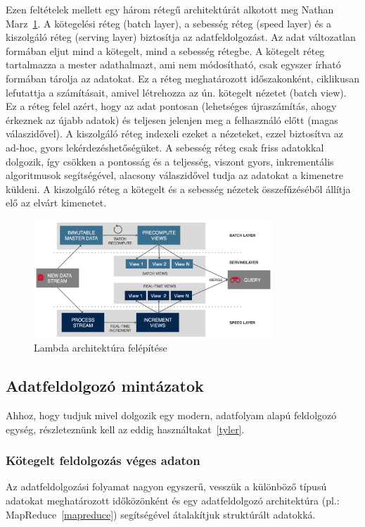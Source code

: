 \documentclass[a4paper,12pt]{article}
\begin{document}
Ezen feltételek mellett egy három rétegű architektúrát alkotott meg Nathan Marz~\ref{lambda}. A kötegelési réteg (batch layer), a sebesség réteg (speed layer) és a kiszolgáló réteg (serving layer) biztosítja az adatfeldolgozást. Az adat változatlan formában eljut mind a kötegelt, mind a sebesség rétegbe. A kötegelt réteg tartalmazza a mester adathalmazt, ami nem módosítható, csak egyszer írható formában tárolja az adatokat. Ez a réteg meghatározott időszakonként, ciklikusan lefutattja a számításait, amivel létrehozza az ún. kötegelt nézetet (batch view). Ez a réteg felel azért, hogy az adat pontosan (lehetséges újraszámítás, ahogy érkeznek az újabb adatok) és teljesen jelenjen meg a felhasználó előtt (magas válaszidővel).  A kiszolgáló réteg indexeli ezeket a nézeteket, ezzel biztosítva az ad-hoc, gyors lekérdezéshetőségüket. \linebreak
A sebesség réteg csak friss adatokkal dolgozik, így csökken a pontosság és a teljesség, viszont gyors, inkrementális algoritmusok segítségével, alacsony válaszidővel tudja az adatokat a kimenetre küldeni. A kiszolgáló réteg a kötegelt és a sebesség nézetek összefűzéséből állítja elő az elvárt kimenetet.

\begin{figure}[ht!]
\centering
\includegraphics[width=90mm]{img/lambda.png}
\caption{Lambda architektúra felépítése \label{lambda}}
\end{figure}


\subsection{Adatfeldolgozó mintázatok}
Ahhoz, hogy tudjuk mivel dolgozik egy modern, adatfolyam alapú feldolgozó egység, részleteznünk kell az eddig használtakat~\ref{tyler}.

\subsubsection{Kötegelt feldolgozás véges adaton}
Az adatfeldolgozási folyamat nagyon egyszerű, vesszük a különböző típusú adatokat meghatározott időközönként és egy adatfeldolgozó architektúra (pl.: MapReduce~\ref{mapreduce}) segítségével átalakítjuk struktúrált adatokká.
\end{document}
